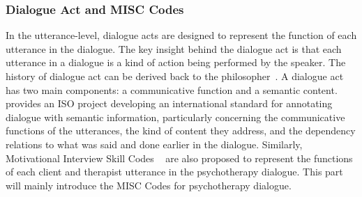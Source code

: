 \subsubsection{Dialogue Act and MISC Codes}
\label{sssec:bg:dialogue-act}
In the utterance-level, dialogue acts are designed to represent the
function of each utterance in the dialogue. The key insight behind the
dialogue act is that each utterance in a dialogue is a kind of action
being performed by the speaker. The history of dialogue act can be
derived back to the philosopher~\citet{wittgenstein2010philosophical}.
A dialogue act has two main components: a communicative function and a
semantic content. \citet{bunt2010towards} provides an ISO project
developing an international standard for annotating dialogue with
semantic information, particularly concerning the communicative
functions of the utterances, the kind of content they address, and the
dependency relations to what was said and done earlier in the
dialogue. Similarly, Motivational Interview Skill Codes
~\cite[MISC,][]{miller2003motivational,miller2012motivational} are
also proposed to represent the functions of each client and therapist
utterance in the psychotherapy dialogue. This part will mainly
introduce the MISC Codes for psychotherapy dialogue.

